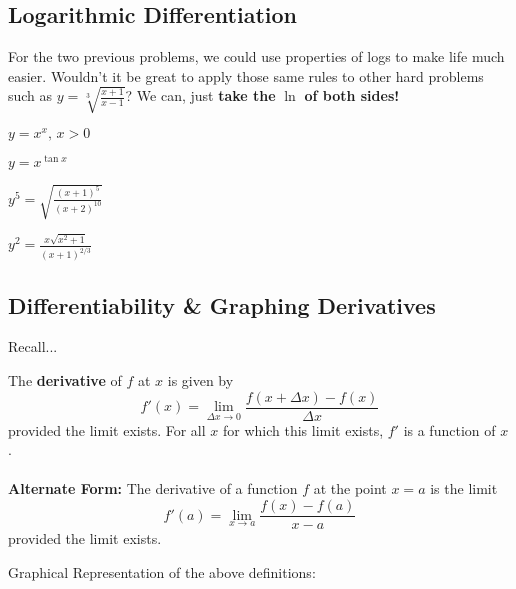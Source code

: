 \documentclass[addpoints, 12pt]{exam}
\begin{document}
\subsection*{Logarithmic Differentiation}
For the two previous problems, we could use properties of logs to make life much easier. Wouldn't it be great to apply those same rules to other hard problems such as $\displaystyle y=\sqrt[3]{\frac{x+1}{x-1}}$? We can, just \textbf{take the }$\ln$\textbf{ of both sides!}
\begin{questions}
    \question $\displaystyle y=x^x,\, x>0$
    
    
    \question $y=x^{\tan x}$
    
    
    \question $\displaystyle y^5=\sqrt{\frac{(x+1)^5}{(x+2)^{10}}}$
    
    
    \question $\displaystyle y^2=\frac{x\sqrt{x^2+1}}{(x+1)^{2/3}}$
    
\end{questions}




\newpage
{}
\subsection*{Differentiability \& Graphing Derivatives}
Recall...
\begin{tcolorbox}[title= DEFINITION OF THE DERIVATIVE OF A FUNCTION,black,sharp corners,colback=white,colbacktitle=white,coltitle=black,boxrule=1pt]

    The \textbf{derivative} of $f$ at $x$ is given by
    \[f'(x)=\lim_{\Delta x\to0}\frac{f(x+\Delta x)-f(x)}{\Delta x}\]
    provided the limit exists. For all $x$ for which this limit exists, $f'$ is a function of $x$.\\
    \\
    \textbf{Alternate Form:} The derivative of a function $f$ at the point $x=a$ is the limit \[f'(a)=\lim_{x\to a}\frac{f(x)-f(a)}{x-a}\]
    provided the limit exists.
    
\end{tcolorbox}
\vspace{.15cm}
Graphical Representation of the above definitions:
\end{document}
